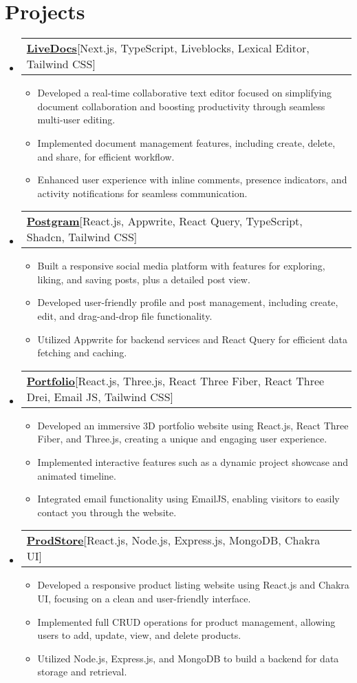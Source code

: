 \documentclass[letterpaper,11pt]{article}
\makeatletter
\newcommand{\resumeItem}[1]{
  \item\small{
    {#1 \vspace{-2pt}}
  }
}
\newcommand{\resumeProjectHeading}[2]{
    \item
    \begin{tabular*}{0.97\textwidth}{l@{\extracolsep{\fill}}r}
      \small#1 & #2 \\
    \end{tabular*}\vspace{-5pt}
}
\newcommand{\resumeSubHeadingListStart}{\begin{itemize}[leftmargin=0.15in, label={}]}
\newcommand{\resumeSubHeadingListEnd}{\end{itemize}}
\newcommand{\resumeItemListStart}{\begin{itemize}}
\newcommand{\resumeItemListEnd}{\end{itemize}}
\makeatother
\begin{document}

\section{Projects}
\vspace{5pt}
\resumeSubHeadingListStart
\resumeProjectHeading
{\textbf{\href{https://github.com/ayush2004patel/collaborative-editor}{LiveDocs}\hspace{5pt}}{{[Next.js, TypeScript, Liveblocks, Lexical Editor, Tailwind CSS]}}}{}
\resumeItemListStart
\resumeItem{Developed a real-time collaborative text editor focused on simplifying document collaboration and boosting productivity through seamless multi-user editing.}
\resumeItem{Implemented document management features, including create, delete, and share, for efficient workflow.}
\resumeItem{Enhanced user experience with inline comments, presence indicators, and activity notifications for seamless communication.}
\resumeItemListEnd
\resumeSubHeadingListEnd

\resumeSubHeadingListStart
\resumeProjectHeading
{\textbf{\href{https://github.com/ayush2004patel/social_media_app}{Postgram}\hspace{5pt}}{{[React.js, Appwrite, React Query, TypeScript, Shadcn, Tailwind CSS]}}}{}
\resumeItemListStart
\resumeItem{Built a responsive social media platform with features for exploring, liking, and saving posts, plus a detailed post view.}
\resumeItem{Developed user-friendly profile and post management, including create, edit, and drag-and-drop file functionality.}
\resumeItem{Utilized Appwrite for backend services and React Query for efficient data fetching and caching.}
\resumeItemListEnd
\resumeSubHeadingListEnd

\resumeSubHeadingListStart
\resumeProjectHeading
{\textbf{\href{https://github.com/ayush2004patel/Portfolio-v2}{Portfolio}\hspace{5pt}}{{[React.js, Three.js, React Three Fiber, React Three Drei, Email JS, Tailwind CSS]}}}{}
\resumeItemListStart
\resumeItem{Developed an immersive 3D portfolio website using React.js, React Three Fiber, and Three.js, creating a unique and engaging user experience.}
\resumeItem{Implemented interactive features such as a dynamic project showcase and animated timeline.}
\resumeItem{Integrated email functionality using EmailJS, enabling visitors to easily contact you through the website.}
\resumeItemListEnd
\resumeSubHeadingListEnd

\resumeSubHeadingListStart
\resumeProjectHeading
{\textbf{\href{https://github.com/ayush2004patel/prod-store}{ProdStore}\hspace{5pt}}{{[React.js, Node.js, Express.js, MongoDB, Chakra UI]}}}{}
\resumeItemListStart
\resumeItem{Developed a responsive product listing website using React.js and Chakra UI, focusing on a clean and user-friendly interface.}
\resumeItem{Implemented full CRUD operations for product management, allowing users to add, update, view, and delete products.}
\resumeItem{Utilized Node.js, Express.js, and MongoDB to build a backend for data storage and retrieval.}
\resumeItemListEnd
\resumeSubHeadingListEnd
\end{document}
